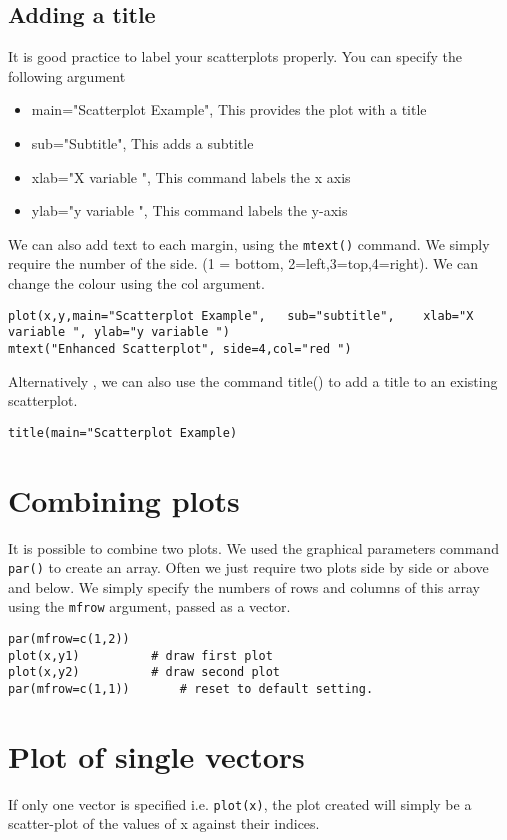 \begin{frame}
\subsection{Adding a title }

It is good practice to label your scatterplots properly. You can specify the following argument
\begin{itemize}
	\item	main="Scatterplot Example", 	This provides the plot with a title
	\item	sub="Subtitle",                 This adds a subtitle
	\item	xlab="X variable ",				This command labels the x axis 
	\item   ylab="y variable ",				This command labels the y-axis
\end{itemize}
We can also add text to each margin, using the \texttt{mtext()} command.  
We simply require the number of the side. (1 = bottom, 2=left,3=top,4=right). 
We can change the colour using the col argument.
\footnotesize \begin{verbatim}
plot(x,y,main="Scatterplot Example",   sub="subtitle",    xlab="X variable ", ylab="y variable ")	
mtext("Enhanced Scatterplot", side=4,col="red ")
\end{verbatim}\normalsize
Alternatively , we can also use the command title() to add a title to an existing scatterplot.
\footnotesize \begin{verbatim}
title(main="Scatterplot Example)	
\end{verbatim}\normalsize


\section{Combining plots}
It is possible to combine two plots. We used the graphical parameters command \texttt{par()} to create an array. 
Often we just require two plots side by side or above and below. We simply specify the numbers of rows and columns of this array using the \texttt{mfrow} argument, passed as a vector.

\begin{verbatim}
par(mfrow=c(1,2))
plot(x,y1)			# draw first plot
plot(x,y2)			# draw second plot
par(mfrow=c(1,1))		# reset to default setting.
\end{verbatim}

\section{Plot of single vectors}
If only one vector is specified i.e. \texttt{plot(x)},  the plot created will simply be a scatter-plot of the values of x against their indices.


\end{frame}
